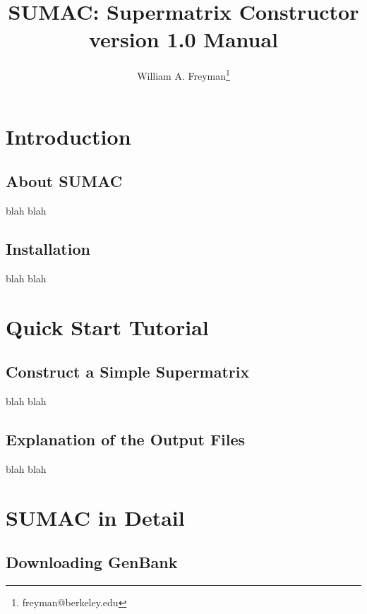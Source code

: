 \documentclass[12pt]{report}
\title{SUMAC: Supermatrix Constructor version 1.0 Manual}
\author{William A. Freyman\thanks{freyman@berkeley.edu}}
\affil{Department of Integrative Biology, University of California, Berkeley}
\date{}
\begin{document}
\maketitle

\tableofcontents


\chapter{Introduction}

\section{About SUMAC}

blah blah

\section{Installation}

blah blah


\chapter{Quick Start Tutorial}

\section{Construct a Simple Supermatrix}

blah blah

\section{Explanation of the Output Files}

blah blah



\chapter{SUMAC in Detail}

\section{Downloading GenBank}
\end{document}
